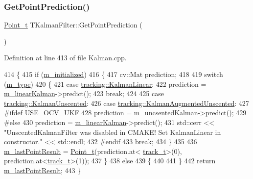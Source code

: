 \subsubsection{\texorpdfstring{Get\+Point\+Prediction()}{GetPointPrediction()}}
{\footnotesize\ttfamily \mbox{\hyperlink{defines_8h_a8c42696da8f098b91374a8e8bb84b430}{Point\+\_\+t}} T\+Kalman\+Filter\+::\+Get\+Point\+Prediction (\begin{DoxyParamCaption}{ }\end{DoxyParamCaption})}



Definition at line 413 of file Kalman.\+cpp.


\begin{DoxyCode}
414 \{
415     \textcolor{keywordflow}{if} (\mbox{\hyperlink{class_t_kalman_filter_a5633e302e878261c8669816695f6a314}{m\_initialized}})
416     \{
417         cv::Mat prediction;
418 
419         \textcolor{keywordflow}{switch} (\mbox{\hyperlink{class_t_kalman_filter_a00cabc6683f6cc848559515df46d7101}{m\_type}})
420         \{
421         \textcolor{keywordflow}{case} \mbox{\hyperlink{namespacetracking_a83f2c4d58ea2737f7d6296dce3eb722aa889eca583e371386c92e05814797a885}{tracking::KalmanLinear}}:
422             prediction = \mbox{\hyperlink{class_t_kalman_filter_aec607aacb57ef1f78e514c6b3ef18435}{m\_linearKalman}}->predict();
423             \textcolor{keywordflow}{break};
424 
425         \textcolor{keywordflow}{case} \mbox{\hyperlink{namespacetracking_a83f2c4d58ea2737f7d6296dce3eb722aa39d914d61ae37e52ad325f55d199dabc}{tracking::KalmanUnscented}}:
426         \textcolor{keywordflow}{case} \mbox{\hyperlink{namespacetracking_a83f2c4d58ea2737f7d6296dce3eb722aa442bc8be9c68f72f1bc7952153cbf4c7}{tracking::KalmanAugmentedUnscented}}:
427 \textcolor{preprocessor}{#ifdef USE\_OCV\_UKF}
428             prediction = m\_uncsentedKalman->predict();
429 \textcolor{preprocessor}{#else}
430             prediction = \mbox{\hyperlink{class_t_kalman_filter_aec607aacb57ef1f78e514c6b3ef18435}{m\_linearKalman}}->predict();
431             std::cerr << \textcolor{stringliteral}{"UnscentedKalmanFilter was disabled in CMAKE! Set KalmanLinear in constructor."} <<
       std::endl;
432 \textcolor{preprocessor}{#endif}
433             \textcolor{keywordflow}{break};
434         \}
435 
436         \mbox{\hyperlink{class_t_kalman_filter_a91efb6a00cfae5df3e513ceba2239fa3}{m\_lastPointResult}} = \mbox{\hyperlink{defines_8h_a8c42696da8f098b91374a8e8bb84b430}{Point\_t}}(prediction.at<
      \mbox{\hyperlink{defines_8h_a7ce9c8817b42ab418e61756f579549ab}{track\_t}}>(0), prediction.at<\mbox{\hyperlink{defines_8h_a7ce9c8817b42ab418e61756f579549ab}{track\_t}}>(1));
437     \}
438     \textcolor{keywordflow}{else}
439     \{
440 
441     \}
442     \textcolor{keywordflow}{return} \mbox{\hyperlink{class_t_kalman_filter_a91efb6a00cfae5df3e513ceba2239fa3}{m\_lastPointResult}};
443 \}
\end{DoxyCode}
